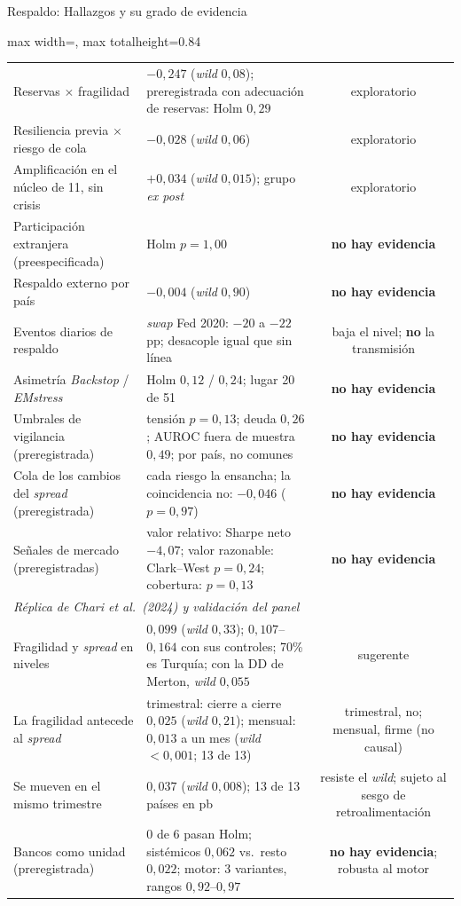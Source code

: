\documentclass[aspectratio=169]{beamer}
\begin{document}
\begin{frame}{Respaldo: Hallazgos y su grado de evidencia}
\begin{adjustbox}{max width=\textwidth, max totalheight=0.84\textheight}
\begin{tabular}{llc}
Reservas $\times$ fragilidad & $-0{,}247$ (\textit{wild} $0{,}08$); preregistrada con adecuación de reservas: Holm $0{,}29$ & exploratorio \\
Resiliencia previa $\times$ riesgo de cola & $-0{,}028$ (\textit{wild} $0{,}06$) & exploratorio \\
Amplificación en el núcleo de 11, sin crisis & $+0{,}034$ (\textit{wild} $0{,}015$); grupo \textit{ex post} & exploratorio \\
Participación extranjera (preespecificada) & Holm $p=1{,}00$ & \textbf{no hay evidencia} \\
Respaldo externo por país & $-0{,}004$ (\textit{wild} $0{,}90$) & \textbf{no hay evidencia} \\
Eventos diarios de respaldo & \textit{swap} Fed 2020: $-20$ a $-22$ pp; desacople igual que sin línea & baja el nivel; \textbf{no} la transmisión \\
Asimetría \textit{Backstop} / \textit{EMstress} & Holm $0{,}12$ / $0{,}24$; lugar 20 de 51 & \textbf{no hay evidencia} \\
Umbrales de vigilancia (preregistrada) & tensión $p=0{,}13$; deuda $0{,}26$; AUROC fuera de muestra $0{,}49$; por país, no comunes & \textbf{no hay evidencia} \\
Cola de los cambios del \textit{spread} (preregistrada) & cada riesgo la ensancha; la coincidencia no: $-0{,}046$ ($p=0{,}97$) & \textbf{no hay evidencia} \\
Señales de mercado (preregistradas) & valor relativo: Sharpe neto $-4{,}07$; valor razonable: Clark--West $p=0{,}24$; cobertura: $p=0{,}13$ & \textbf{no hay evidencia} \\
\midrule
\multicolumn{3}{l}{\textit{Réplica de Chari et al.\ (2024) y validación del panel}} \\
Fragilidad y \textit{spread} en niveles & $0{,}099$ (\textit{wild} $0{,}33$); $0{,}107$--$0{,}164$ con sus controles; 70\% es Turquía; con la DD de Merton, \textit{wild} $0{,}055$ & sugerente \\
La fragilidad antecede al \textit{spread} & trimestral: cierre a cierre $0{,}025$ (\textit{wild} $0{,}21$); mensual: $0{,}013$ a un mes (\textit{wild} $<0{,}001$; 13 de 13) & trimestral, no; mensual, firme (no causal) \\
Se mueven en el mismo trimestre & $0{,}037$ (\textit{wild} $0{,}008$); 13 de 13 países en pb & resiste el \textit{wild}; sujeto al sesgo de retroalimentación \\
Bancos como unidad (preregistrada) & 0 de 6 pasan Holm; sistémicos $0{,}062$ vs.\ resto $0{,}022$; motor: 3 variantes, rangos $0{,}92$--$0{,}97$ & \textbf{no hay evidencia}; robusta al motor \\
\bottomrule
\end{tabular}
\end{adjustbox}
\end{frame}
\end{document}
